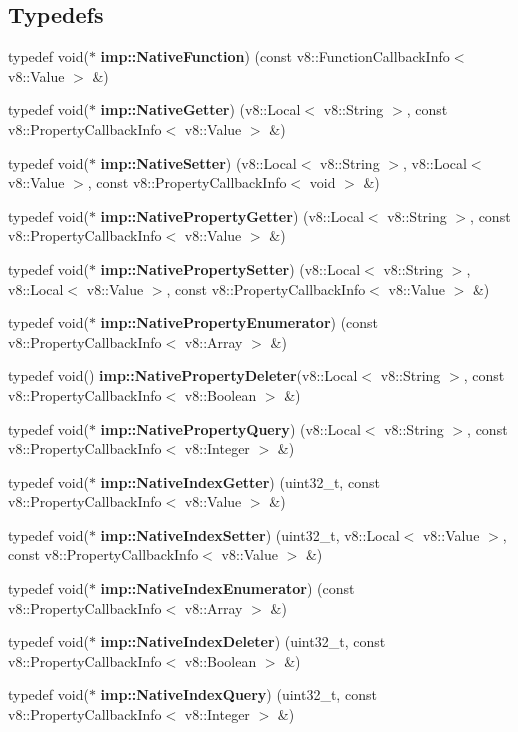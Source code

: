 \subsection*{Typedefs}
\begin{DoxyCompactItemize}
\item 
typedef void($\ast$ \textbf{ imp\+::\+Native\+Function}) (const v8\+::\+Function\+Callback\+Info$<$ v8\+::\+Value $>$ \&)
\item 
typedef void($\ast$ \textbf{ imp\+::\+Native\+Getter}) (v8\+::\+Local$<$ v8\+::\+String $>$, const v8\+::\+Property\+Callback\+Info$<$ v8\+::\+Value $>$ \&)
\item 
typedef void($\ast$ \textbf{ imp\+::\+Native\+Setter}) (v8\+::\+Local$<$ v8\+::\+String $>$, v8\+::\+Local$<$ v8\+::\+Value $>$, const v8\+::\+Property\+Callback\+Info$<$ void $>$ \&)
\item 
typedef void($\ast$ \textbf{ imp\+::\+Native\+Property\+Getter}) (v8\+::\+Local$<$ v8\+::\+String $>$, const v8\+::\+Property\+Callback\+Info$<$ v8\+::\+Value $>$ \&)
\item 
typedef void($\ast$ \textbf{ imp\+::\+Native\+Property\+Setter}) (v8\+::\+Local$<$ v8\+::\+String $>$, v8\+::\+Local$<$ v8\+::\+Value $>$, const v8\+::\+Property\+Callback\+Info$<$ v8\+::\+Value $>$ \&)
\item 
typedef void($\ast$ \textbf{ imp\+::\+Native\+Property\+Enumerator}) (const v8\+::\+Property\+Callback\+Info$<$ v8\+::\+Array $>$ \&)
\item 
typedef void() \textbf{ imp\+::\+Native\+Property\+Deleter}(v8\+::\+Local$<$ v8\+::\+String $>$, const v8\+::\+Property\+Callback\+Info$<$ v8\+::\+Boolean $>$ \&)
\item 
typedef void($\ast$ \textbf{ imp\+::\+Native\+Property\+Query}) (v8\+::\+Local$<$ v8\+::\+String $>$, const v8\+::\+Property\+Callback\+Info$<$ v8\+::\+Integer $>$ \&)
\item 
typedef void($\ast$ \textbf{ imp\+::\+Native\+Index\+Getter}) (uint32\+\_\+t, const v8\+::\+Property\+Callback\+Info$<$ v8\+::\+Value $>$ \&)
\item 
typedef void($\ast$ \textbf{ imp\+::\+Native\+Index\+Setter}) (uint32\+\_\+t, v8\+::\+Local$<$ v8\+::\+Value $>$, const v8\+::\+Property\+Callback\+Info$<$ v8\+::\+Value $>$ \&)
\item 
typedef void($\ast$ \textbf{ imp\+::\+Native\+Index\+Enumerator}) (const v8\+::\+Property\+Callback\+Info$<$ v8\+::\+Array $>$ \&)
\item 
typedef void($\ast$ \textbf{ imp\+::\+Native\+Index\+Deleter}) (uint32\+\_\+t, const v8\+::\+Property\+Callback\+Info$<$ v8\+::\+Boolean $>$ \&)
\item 
typedef void($\ast$ \textbf{ imp\+::\+Native\+Index\+Query}) (uint32\+\_\+t, const v8\+::\+Property\+Callback\+Info$<$ v8\+::\+Integer $>$ \&)
\end{DoxyCompactItemize}
